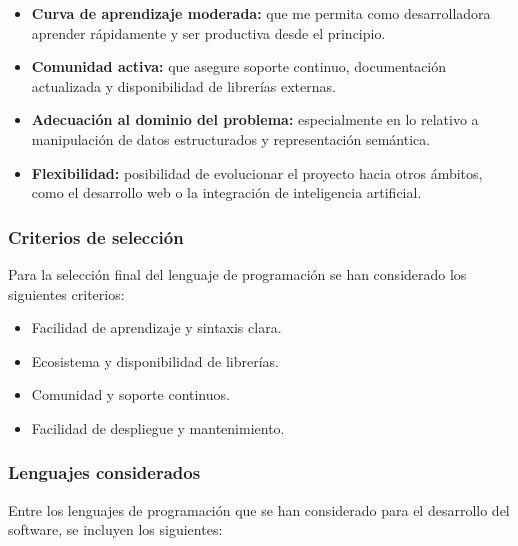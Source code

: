 \begin{itemize}
    \item \textbf{Curva de aprendizaje moderada: } que me permita como desarrolladora aprender
    rápidamente y ser productiva desde el principio.
    \item \textbf{Comunidad activa:} que asegure soporte continuo, documentación actualizada y 
    disponibilidad de librerías externas.
    \item \textbf{Adecuación al dominio del problema:} especialmente en lo relativo a 
    manipulación de datos estructurados y representación semántica.
    \item \textbf{Flexibilidad:} posibilidad de evolucionar el proyecto hacia otros ámbitos, 
    como el desarrollo web o la integración de inteligencia artificial.
\end{itemize}

\subsubsection{Criterios de selección}
Para la selección final del lenguaje de programación se han considerado los siguientes criterios:

\begin{itemize}
    \item Facilidad de aprendizaje y sintaxis clara.
    \item Ecosistema y disponibilidad de librerías.
    \item Comunidad y soporte continuos.
    \item Facilidad de despliegue y mantenimiento.
\end{itemize}

\subsubsection{Lenguajes considerados}
Entre los lenguajes de programación que se han considerado para el desarrollo del software, se 
incluyen los siguientes:


